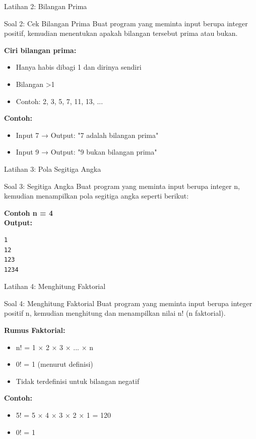 \documentclass{beamer}
\begin{document}
\begin{frame}{Latihan 2: Bilangan Prima}
  \begin{block}{Soal 2: Cek Bilangan Prima}
    Buat program yang meminta input berupa integer positif, kemudian menentukan apakah bilangan tersebut prima atau bukan.
    
    \textbf{Ciri bilangan prima:}
    \begin{itemize}
      \item Hanya habis dibagi 1 dan dirinya sendiri
      \item Bilangan \textgreater 1
      \item Contoh: 2, 3, 5, 7, 11, 13, ...
    \end{itemize}
    
    \textbf{Contoh:}
    \begin{itemize}
      \item Input 7 → Output: "7 adalah bilangan prima"
      \item Input 9 → Output: "9 bukan bilangan prima"
    \end{itemize}
  \end{block}
\end{frame}

\begin{frame}[fragile]{Latihan 3: Pola Segitiga Angka}
  \begin{block}{Soal 3: Segitiga Angka}
    Buat program yang meminta input berupa integer n, kemudian menampilkan pola segitiga angka seperti berikut:
    
    \textbf{Contoh n = 4\\Output:}
    \begin{verbatim}
1
12
123
1234
    \end{verbatim}
  \end{block}
\end{frame}

\begin{frame}{Latihan 4: Menghitung Faktorial}
  \begin{block}{Soal 4: Menghitung Faktorial}
    Buat program yang meminta input berupa integer positif n, kemudian menghitung dan menampilkan nilai n! (n faktorial).
    
    \textbf{Rumus Faktorial:}
    \begin{itemize}
      \item n! = 1 × 2 × 3 × ... × n
      \item 0! = 1 (menurut definisi)
      \item Tidak terdefinisi untuk bilangan negatif
    \end{itemize}
    
    \textbf{Contoh:}
    \begin{itemize}
      \item 5! = 5 × 4 × 3 × 2 × 1 = 120
      \item 0! = 1
    \end{itemize}
  \end{block}
\end{frame}
\end{document}
